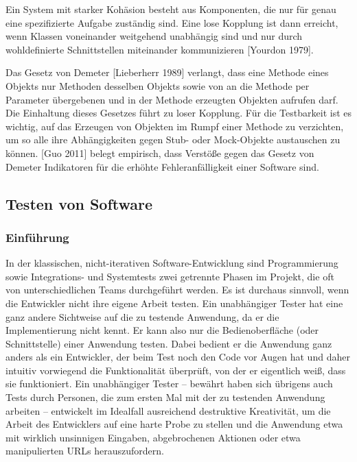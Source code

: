 \begin{itemize}
	Ein System mit starker Kohäsion besteht aus Komponenten, die nur für genau eine spezifizierte Aufgabe 
	zuständig sind. Eine lose Kopplung ist dann erreicht, wenn Klassen voneinander weitgehend unabhängig 
	sind und nur durch wohldefinierte Schnittstellen miteinander kommunizieren [Yourdon 1979].
	
	Das Gesetz von Demeter [Lieberherr 1989] verlangt, dass eine Methode eines Objekts nur Methoden desselben 
	Objekts sowie von an die Methode per Parameter übergebenen und 	in der Methode erzeugten Objekten aufrufen darf. 
	Die Einhaltung dieses Gesetzes führt zu loser Kopplung. Für die Testbarkeit ist es wichtig, auf das Erzeugen von Objekten im
	Rumpf einer Methode zu verzichten, um so alle ihre Abhängigkeiten gegen Stub- oder
	Mock-Objekte austauschen zu können. [Guo 2011] belegt empirisch, dass Verstöße gegen
	das Gesetz von Demeter Indikatoren für die erhöhte Fehleranfälligkeit einer Software sind.
	
\end{itemize}

\subsection{Testen von Software}\label{arten-von-tests} 
\subsubsection{Einführung}
In der klassischen, nicht-iterativen Software-Entwicklung sind Programmierung sowie
Integrations- und Systemtests zwei getrennte Phasen im Projekt, die oft von unterschiedlichen
Teams durchgeführt werden. Es ist durchaus sinnvoll, wenn die Entwickler nicht
ihre eigene Arbeit testen. Ein unabhängiger Tester hat eine ganz andere Sichtweise auf
die zu testende Anwendung, da er die Implementierung nicht kennt. Er kann also nur
die Bedienoberfläche (oder Schnittstelle) einer Anwendung testen. Dabei bedient er die
Anwendung ganz anders als ein Entwickler, der beim Test noch den Code vor Augen hat
und daher intuitiv vorwiegend die Funktionalität überprüft, von der er eigentlich weiß,
dass sie funktioniert. Ein unabhängiger Tester – bewährt haben sich übrigens auch Tests
durch Personen, die zum ersten Mal mit der zu testenden Anwendung arbeiten – entwickelt
im Idealfall ausreichend destruktive Kreativität, um die Arbeit des Entwicklers auf
eine harte Probe zu stellen und die Anwendung etwa mit wirklich unsinnigen Eingaben,
abgebrochenen Aktionen oder etwa manipulierten URLs herauszufordern.

